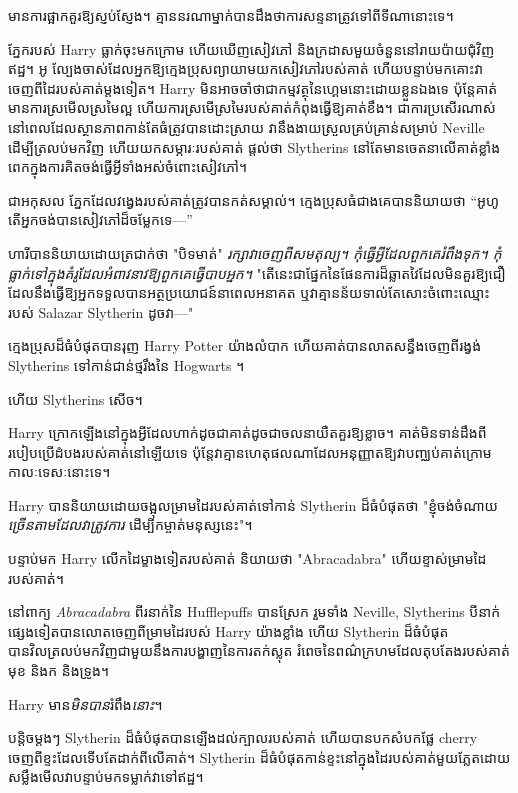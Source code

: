 មាន​ការ​ផ្អាក​គួរ​ឱ្យ​ស្ញប់ស្ញែង។ គ្មាន​នរណា​ម្នាក់​បាន​ដឹង​ថា​ការ​សន្ទនា​ត្រូវ​ទៅ​ពី​ទី​ណា​នោះ​ទេ។

ភ្នែករបស់ Harry ធ្លាក់ចុះមកក្រោម ហើយឃើញសៀវភៅ និងក្រដាសមួយចំនួននៅរាយប៉ាយជុំវិញឥដ្ឋ។ អូ ល្បែងចាស់ដែលអ្នកឱ្យក្មេងប្រុសព្យាយាមយកសៀវភៅរបស់គាត់ ហើយបន្ទាប់មកគោះវាចេញពីដៃរបស់គាត់ម្តងទៀត។ Harry មិនអាចចាំថាជាកម្មវត្ថុនៃហ្គេមនោះដោយខ្លួនឯងទេ ប៉ុន្តែគាត់មានការស្រមើលស្រមៃល្អ ហើយការស្រមើស្រមៃរបស់គាត់កំពុងធ្វើឱ្យគាត់ខឹង។ ជាការប្រសើរណាស់ នៅពេលដែលស្ថានភាពកាន់តែធំត្រូវបានដោះស្រាយ វានឹងងាយស្រួលគ្រប់គ្រាន់សម្រាប់ Neville ដើម្បីត្រលប់មកវិញ ហើយយកសម្ភារៈរបស់គាត់ ផ្តល់ថា Slytherins នៅតែមានចេតនាលើគាត់ខ្លាំងពេកក្នុងការគិតចង់ធ្វើអ្វីទាំងអស់ចំពោះសៀវភៅ។

ជាអកុសល ភ្នែកដែលវង្វេងរបស់គាត់ត្រូវបានកត់សម្គាល់។ ក្មេង​ប្រុស​ធំ​ជាង​គេ​បាន​និយាយ​ថា “អូហូ តើ​អ្នក​ចង់​បាន​សៀវភៅ​ដ៏​ចម្លែក​ទេ—”

ហារីបាននិយាយដោយត្រជាក់ថា "បិទមាត់" \emph{រក្សាវាចេញពីសមតុល្យ។ កុំធ្វើអ្វីដែលពួកគេរំពឹងទុក។ កុំធ្លាក់ទៅក្នុងគំរូដែលអំពាវនាវឱ្យពួកគេធ្វើបាបអ្នក។} "តើនេះជាផ្នែកនៃផែនការដ៏ឆ្លាតវៃដែលមិនគួរឱ្យជឿដែលនឹងធ្វើឱ្យអ្នកទទួលបានអត្ថប្រយោជន៍នាពេលអនាគត ឬវាគ្មានន័យទាល់តែសោះចំពោះឈ្មោះរបស់ Salazar Slytherin ដូចវា—"

ក្មេងប្រុសដ៏ធំបំផុតបានរុញ Harry Potter យ៉ាងលំបាក ហើយគាត់បានលាតសន្ធឹងចេញពីរង្វង់ Slytherins ទៅកាន់ជាន់ថ្មរឹងនៃ Hogwarts ។

ហើយ Slytherins សើច។

Harry ក្រោកឡើងនៅក្នុងអ្វីដែលហាក់ដូចជាគាត់ដូចជាចលនាយឺតគួរឱ្យខ្លាច។ គាត់​មិនទាន់​ដឹង​ពី​របៀប​ប្រើ​ដំបង​របស់គាត់​នៅឡើយ​ទេ ប៉ុន្តែ​វា​គ្មាន​ហេតុផល​ណា​ដែល​អនុញ្ញាតឱ្យ​វា​បញ្ឈប់​គាត់​ក្រោម​កាលៈទេសៈ​នោះទេ​។

Harry បាននិយាយដោយចង្អុលម្រាមដៃរបស់គាត់ទៅកាន់ Slytherin ដ៏ធំបំផុតថា "ខ្ញុំចង់ចំណាយ \emph{ច្រើនតាមដែលវាត្រូវការ} ដើម្បីកម្ចាត់មនុស្សនេះ"។

បន្ទាប់មក Harry លើកដៃម្ខាងទៀតរបស់គាត់ និយាយថា "Abracadabra" ហើយខ្ទាស់ម្រាមដៃរបស់គាត់។

នៅពាក្យ \emph{Abracadabra} ពីរនាក់នៃ Hufflepuffs បានស្រែក រួមទាំង Neville, Slytherins បីនាក់ផ្សេងទៀតបានលោតចេញពីម្រាមដៃរបស់ Harry យ៉ាងខ្លាំង ហើយ Slytherin ដ៏ធំបំផុតបានវិលត្រលប់មកវិញជាមួយនឹងការបង្ហាញនៃការតក់ស្លុត រំពេចនៃពណ៌ក្រហមដែលតុបតែងរបស់គាត់ មុខ និងក និងទ្រូង។

Harry មាន\emph{មិនបាន}រំពឹង\emph{នោះ}។

បន្តិចម្ដងៗ Slytherin ដ៏ធំបំផុតបានឡើងដល់ក្បាលរបស់គាត់ ហើយបានបកសំបកផ្លែ cherry ចេញពីខ្ទះដែលទើបតែដាក់ពីលើគាត់។ Slytherin ដ៏ធំបំផុតកាន់ខ្ទះនៅក្នុងដៃរបស់គាត់មួយភ្លែតដោយសម្លឹងមើលវាបន្ទាប់មកទម្លាក់វាទៅឥដ្ឋ។

